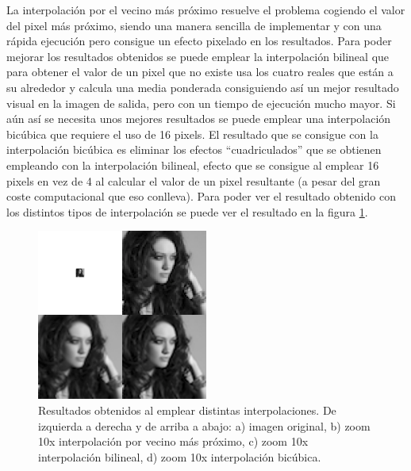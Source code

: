 \documentclass{article}
\begin{document}
	La interpolación por el vecino más próximo resuelve el problema cogiendo el valor del pixel más próximo, siendo una manera sencilla de implementar y con una rápida ejecución pero consigue un efecto pixelado en los resultados. Para poder mejorar los resultados obtenidos se puede emplear la interpolación bilineal que para obtener el valor de un pixel que no existe usa los cuatro reales que están a su alrededor y calcula una media ponderada consiguiendo así un mejor resultado visual en la imagen de salida, pero con un tiempo de ejecución mucho mayor. Si aún así se necesita unos mejores resultados se puede emplear una interpolación bicúbica que requiere el uso de 16 pixels. El resultado que se consigue con la interpolación bicúbica es eliminar los efectos ``cuadriculados'' que se obtienen empleando con la interpolación bilineal, efecto que se consigue al emplear 16 pixels en vez de 4 al calcular el valor de un pixel resultante (a pesar del gran coste computacional que eso conlleva). Para poder ver el resultado obtenido con los distintos tipos de interpolación se puede ver el resultado en la figura \ref{fig:interpolationExample}.

\begin{figure}[h]
  \centering
    \includegraphics[width=0.5\textwidth]{img/example.png}
  \caption{Resultados obtenidos al emplear distintas interpolaciones. De izquierda a derecha y de arriba a abajo:
  a) imagen original, b) zoom 10x interpolación por vecino más próximo, c) zoom 10x interpolación bilineal, d) zoom 10x interpolación bicúbica.}
  \label{fig:interpolationExample}
\end{figure}
\end{document}
